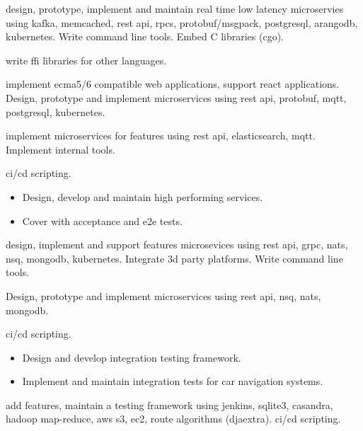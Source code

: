 \documentclass[10pt,a4paper,ragged2e,withhyper]{altacv}
\begin{document}

 design, prototype, implement and maintain real time low latency
microservies using kafka, memcached, rest api, rpcs, protobuf/msgpack,
postgresql, arangodb, kubernetes. Write command line tools. Embed C libraries
(cgo).

 write ffi libraries for other languages.

 implement ecma5/6 compatible web applications, support react
applications. Design, prototype and implement microservices using rest api,
protobuf, mqtt, postgresql, kubernetes.

 implement microservices for features using rest api, elasticsearch,
mqtt. Implement internal tools.

 ci/cd scripting.

\divider

\begin{itemize}
\item Design, develop and maintain high performing services.
\item Cover with acceptance and e2e tests.
\end{itemize}


 design, implement and support features microsevices using rest
api, grpc, nats, nsq, mongodb, kubernetes. Integrate 3d party platforms. Write
command line tools.

 Design, prototype and implement microservices using rest api,
nsq, nats, mongodb.

 ci/cd scripting.

\divider

\begin{itemize}
\item Design and develop integration testing framework.
\item Implement and maintain integration tests for car navigation systems.
\end{itemize}


 add features, maintain a testing framework using jenkins,
sqlite3, casandra, hadoop map-reduce, aws s3, ec2, route algorithms (djaextra).
ci/cd scripting.
\end{document}
